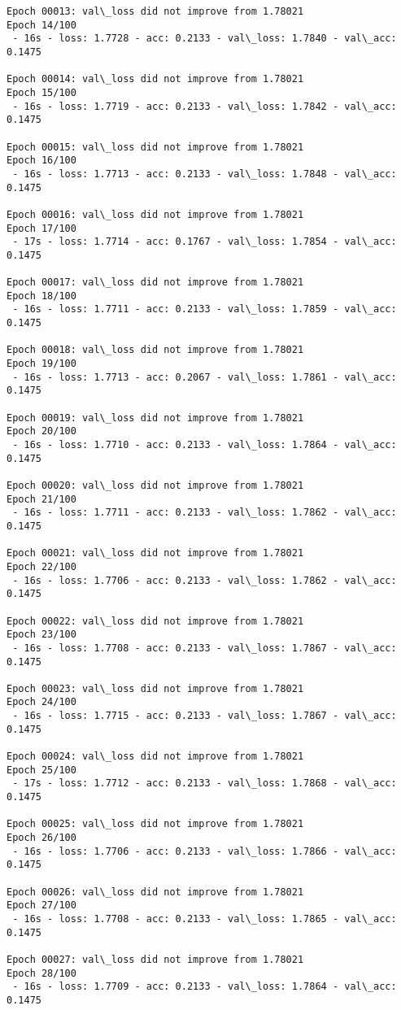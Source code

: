 \documentclass[11pt]{article}
\begin{document}
\begin{Verbatim}[commandchars=\\\{\}]
Epoch 00013: val\_loss did not improve from 1.78021
Epoch 14/100
 - 16s - loss: 1.7728 - acc: 0.2133 - val\_loss: 1.7840 - val\_acc: 0.1475

Epoch 00014: val\_loss did not improve from 1.78021
Epoch 15/100
 - 16s - loss: 1.7719 - acc: 0.2133 - val\_loss: 1.7842 - val\_acc: 0.1475

Epoch 00015: val\_loss did not improve from 1.78021
Epoch 16/100
 - 16s - loss: 1.7713 - acc: 0.2133 - val\_loss: 1.7848 - val\_acc: 0.1475

Epoch 00016: val\_loss did not improve from 1.78021
Epoch 17/100
 - 17s - loss: 1.7714 - acc: 0.1767 - val\_loss: 1.7854 - val\_acc: 0.1475

Epoch 00017: val\_loss did not improve from 1.78021
Epoch 18/100
 - 16s - loss: 1.7711 - acc: 0.2133 - val\_loss: 1.7859 - val\_acc: 0.1475

Epoch 00018: val\_loss did not improve from 1.78021
Epoch 19/100
 - 16s - loss: 1.7713 - acc: 0.2067 - val\_loss: 1.7861 - val\_acc: 0.1475

Epoch 00019: val\_loss did not improve from 1.78021
Epoch 20/100
 - 16s - loss: 1.7710 - acc: 0.2133 - val\_loss: 1.7864 - val\_acc: 0.1475

Epoch 00020: val\_loss did not improve from 1.78021
Epoch 21/100
 - 16s - loss: 1.7711 - acc: 0.2133 - val\_loss: 1.7862 - val\_acc: 0.1475

Epoch 00021: val\_loss did not improve from 1.78021
Epoch 22/100
 - 16s - loss: 1.7706 - acc: 0.2133 - val\_loss: 1.7862 - val\_acc: 0.1475

Epoch 00022: val\_loss did not improve from 1.78021
Epoch 23/100
 - 16s - loss: 1.7708 - acc: 0.2133 - val\_loss: 1.7867 - val\_acc: 0.1475

Epoch 00023: val\_loss did not improve from 1.78021
Epoch 24/100
 - 16s - loss: 1.7715 - acc: 0.2133 - val\_loss: 1.7867 - val\_acc: 0.1475

Epoch 00024: val\_loss did not improve from 1.78021
Epoch 25/100
 - 17s - loss: 1.7712 - acc: 0.2133 - val\_loss: 1.7868 - val\_acc: 0.1475

Epoch 00025: val\_loss did not improve from 1.78021
Epoch 26/100
 - 16s - loss: 1.7706 - acc: 0.2133 - val\_loss: 1.7866 - val\_acc: 0.1475

Epoch 00026: val\_loss did not improve from 1.78021
Epoch 27/100
 - 16s - loss: 1.7708 - acc: 0.2133 - val\_loss: 1.7865 - val\_acc: 0.1475

Epoch 00027: val\_loss did not improve from 1.78021
Epoch 28/100
 - 16s - loss: 1.7709 - acc: 0.2133 - val\_loss: 1.7864 - val\_acc: 0.1475


\end{Verbatim}
\end{document}
